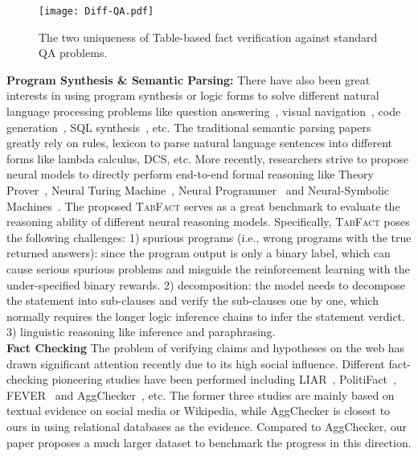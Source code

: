 \documentclass{article} \usepackage{iclr2020_conference,times}
\begin{document}
\begin{figure*}
    \centering
    \texttt{[image: Diff-QA.pdf]}
    \vspace{-2ex}
    \caption{The two uniqueness of Table-based fact verification against standard QA problems. }
    \label{fig:difference}
    \vspace{-2ex}
\end{figure*}

\noindent \textbf{Program Synthesis \& Semantic Parsing:}
There have also been great interests in using program synthesis or logic forms to solve different natural language processing problems like question answering~\citep{liang2013learning,berant2013semantic,berant2014semantic}, visual navigation~\citep{artzi2014learning,artzi2013weakly}, code generation~\citep{yin2017syntactic,dong2016language}, SQL synthesis~\citep{yu2018spider}, etc. The traditional semantic parsing papers~\citep{artzi2014learning,artzi2013weakly,zettlemoyer2005learning,liang2013learning,berant2013semantic} greatly rely on rules, lexicon to parse natural language sentences into different forms like lambda calculus, DCS, etc. More recently, researchers strive to propose neural models to directly perform end-to-end formal reasoning like Theory Prover~\citep{riedel2016programming,rocktaschel2017end}, Neural Turing Machine~\citep{graves2014neural}, Neural Programmer~\citep{neelakantan2016neural,neelakantan2017learning} and Neural-Symbolic Machines~\citep{liang2017neural,liang2018memory,agarwal2019learning}. The proposed \textsc{TabFact} serves as a great benchmark to evaluate the reasoning ability of different neural reasoning models. Specifically, \textsc{TabFact} poses the following challenges: 1) spurious programs (i.e., wrong programs with the true returned answers): since the program output is only a binary label, which can cause serious spurious problems and misguide the reinforcement learning with the under-specified binary rewards. 2) decomposition: the model needs to decompose the statement into sub-clauses and verify the sub-clauses one by one, which normally requires the longer logic inference chains to infer the statement verdict. 3) linguistic reasoning like inference and paraphrasing.  \vspace{3px}\\

\noindent \textbf{Fact Checking}
The problem of verifying claims and hypotheses on the web has drawn significant attention recently due to its high social influence. Different fact-checking pioneering studies have been performed including LIAR~\citep{wang2017liar}, PolitiFact~\citep{vlachos2014fact}, FEVER~\citep{thorne2018fever} and AggChecker~\citep{jo2019aggchecker}, etc. The former three studies are mainly based on textual evidence on social media or Wikipedia, while AggChecker is closest to ours in using relational databases as the evidence. Compared to AggChecker, our paper proposes a much larger dataset to benchmark the progress in this direction. 
\end{document}
